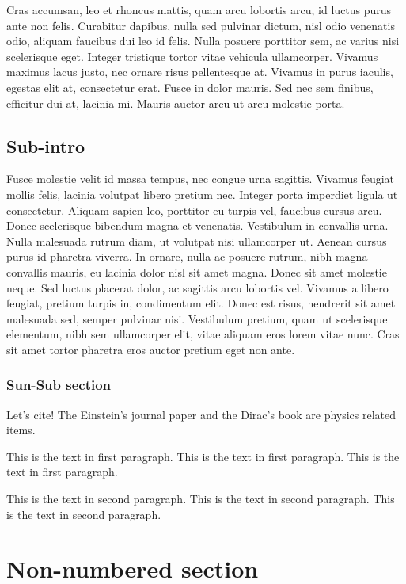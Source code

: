 \documentclass{article}
\begin{document}
Cras accumsan, leo et rhoncus mattis, quam arcu lobortis arcu, id luctus purus ante non felis. Curabitur dapibus, nulla sed pulvinar dictum, nisl odio venenatis odio, aliquam faucibus dui leo id felis. Nulla posuere porttitor sem, ac varius nisi scelerisque eget. Integer tristique tortor vitae vehicula ullamcorper. Vivamus maximus lacus justo, nec ornare risus pellentesque at. Vivamus in purus iaculis, egestas elit at, consectetur erat. Fusce in dolor mauris. Sed nec sem finibus, efficitur dui at, lacinia mi. Mauris auctor arcu ut arcu molestie porta.
\subsection{Sub-intro}
Fusce molestie velit id massa tempus, nec congue urna sagittis. Vivamus feugiat mollis felis, lacinia volutpat libero pretium nec. Integer porta imperdiet ligula ut consectetur. Aliquam sapien leo, porttitor eu turpis vel, faucibus cursus arcu. Donec scelerisque bibendum magna et venenatis. Vestibulum in convallis urna. Nulla malesuada rutrum diam, ut volutpat nisi ullamcorper ut. Aenean cursus purus id pharetra viverra. In ornare, nulla ac posuere rutrum, nibh magna convallis mauris, eu lacinia dolor nisl sit amet magna. Donec sit amet molestie neque. Sed luctus placerat dolor, ac sagittis arcu lobortis vel. Vivamus a libero feugiat, pretium turpis in, condimentum elit. Donec est risus, hendrerit sit amet malesuada sed, semper pulvinar nisi. Vestibulum pretium, quam ut scelerisque elementum, nibh sem ullamcorper elit, vitae aliquam eros lorem vitae nunc. Cras sit amet tortor pharetra eros auctor pretium eget non ante.
\subsubsection{Sun-Sub section}

Let's cite! The Einstein's journal paper \cite{einstein} and the Dirac's 
book \cite{dirac} are physics related items. 

\printbibliography




This is the text in first paragraph. This is the text in first 
paragraph. This is the text in first paragraph. \par
This is the text in second paragraph. This is the text in second 
paragraph. This is the text in second paragraph.

\section*{Non-numbered section} 
 
\end{document}
